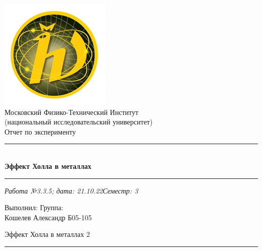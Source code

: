 \documentclass[12pt,a4paper]{scrartcl}
\begin{document}
	\begin{titlepage}
		
		\vspace*{\fill}
		
		\begin{center}
			\includegraphics[scale=0.8]{MIPT.png}
			\\[0.7cm]\Huge Московский Физико-Технический Институт\\(национальный исследовательский университет)
			\\[2cm]\LARGE Отчет по эксперименту
			\\[0.5cm]\noindent\rule{\textwidth}{1pt}
			\\\Huge\textbf{Эффект Холла в металлах}
			\\[-0.5cm]\noindent\rule{\textwidth}{1pt}
		\end{center}
		
		\begin{flushleft}
			\textit{Работа №3.3.5; дата: 21.10.22}\hfill\textit{Семестр: 3}
		\end{flushleft}
		
		\vspace*{\fill}
		
		\begin{flushleft}
			Выполнил: \hspace{\fill} Группа:
			\\Кошелев Александр \hspace{\fill} Б05-105
		\end{flushleft}
	\end{titlepage}
	
	
	\begin{flushleft}
		\footnotesize{Эффект Холла в металлах} \hspace{\fill} \footnotesize{2}
		\\[-0.3cm]\noindent\rule{\textwidth}{0.3pt}
	\end{flushleft}
	
\end{document}
